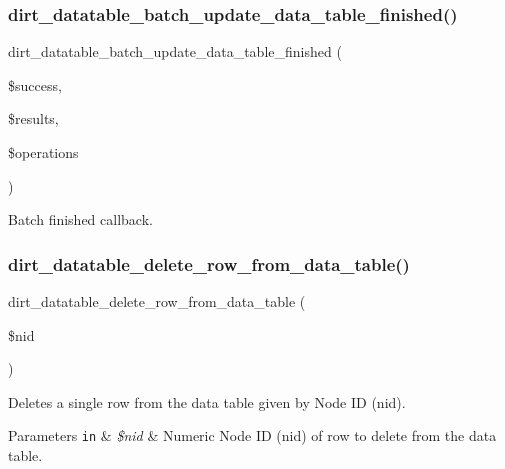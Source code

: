 \subsubsection{\texorpdfstring{dirt\+\_\+datatable\+\_\+batch\+\_\+update\+\_\+data\+\_\+table\+\_\+finished()}{dirt\_datatable\_batch\_update\_data\_table\_finished()}}
{\footnotesize\ttfamily dirt\+\_\+datatable\+\_\+batch\+\_\+update\+\_\+data\+\_\+table\+\_\+finished (\begin{DoxyParamCaption}\item[{}]{\$success,  }\item[{}]{\$results,  }\item[{}]{\$operations }\end{DoxyParamCaption})}

Batch finished callback. \mbox{\label{dirt__datatable_8search__table__db__ops_8inc_a236d3a37a219ea8ee437c3e95b71fa63}} 
\subsubsection{\texorpdfstring{dirt\+\_\+datatable\+\_\+delete\+\_\+row\+\_\+from\+\_\+data\+\_\+table()}{dirt\_datatable\_delete\_row\_from\_data\_table()}}
{\footnotesize\ttfamily dirt\+\_\+datatable\+\_\+delete\+\_\+row\+\_\+from\+\_\+data\+\_\+table (\begin{DoxyParamCaption}\item[{}]{\$nid }\end{DoxyParamCaption})}

Deletes a single row from the data table given by Node ID (nid).


\begin{DoxyParams}[1]{Parameters}
\mbox{\tt in}  & {\em \$nid} & Numeric Node ID (nid) of row to delete from the data table.\\
\hline
\end{DoxyParams}

